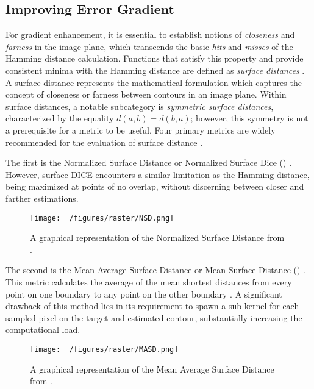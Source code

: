\subsection{Improving Error Gradient}
For gradient enhancement, it is essential to establish notions of \emph{closeness} and \emph{farness} in the image plane, which transcends the basic \emph{hits} and \emph{misses} of the Hamming distance calculation.
Functions that satisfy this property and provide consistent minima with the Hamming distance are defined as \textit{surface distances} \cite{reinkeCommonLimitationsImage2023,reinkeUnderstandingMetricrelatedPitfalls2023}.
A surface distance represents the mathematical formulation which captures the concept of closeness or farness between contours in an image plane.
Within surface distances, a notable subcategory is \emph{symmetric surface distances}, characterized by the equality $d(a,b) = d(b,a)$; however, this symmetry is not a prerequisite for a metric to be useful.
Four primary metrics are widely recommended for the evaluation of surface distance \cite{reinkeUnderstandingMetricrelatedPitfalls2023,reinkeCommonLimitationsImage2023}.

The first is the Normalized Surface Distance or Normalized Surface Dice () \cite{nikolovClinicallyApplicableSegmentation2021} .
However, surface DICE encounters a similar limitation as the Hamming distance, being maximized at points of no overlap, without discerning between closer and farther estimations.

\begin{figure}[h!]
  \centering
  \texttt{[image: ~/figures/raster/NSD.png]}
  \caption{A graphical representation of the Normalized Surface Distance from \cite{reinkeUnderstandingMetricrelatedPitfalls2023,reinkeCommonLimitationsImage2023}.}
  \label{fig:surfDICE}
\end{figure}

The second is the Mean Average Surface Distance or Mean Surface Distance () \cite{benesPerformanceEvaluationImage2015}.
This metric calculates the average of the mean shortest distances from every point on one boundary to any point on the other boundary \cite{reinkeCommonLimitationsImage2023,reinkeUnderstandingMetricrelatedPitfalls2023}.
A significant drawback of this method lies in its requirement to spawn a sub-kernel for each sampled pixel on the target and estimated contour, substantially increasing the computational load.

\begin{figure}[h!]
  \centering
  \texttt{[image: ~/figures/raster/MASD.png]}
  \caption{A graphical representation of the Mean Average Surface Distance from \cite{reinkeCommonLimitationsImage2023,reinkeUnderstandingMetricrelatedPitfalls2023}.}
  \label{fig:MASD}
\end{figure}

